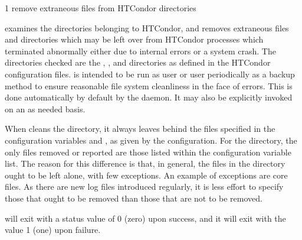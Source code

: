 \begin{ManPage}{\label{man-condor-preen}}{1}
{remove extraneous files from HTCondor directories}
\Synopsis {}


\Description 

 examines the directories belonging to HTCondor, 
and removes extraneous files and directories which may be left over from
HTCondor processes which terminated abnormally either due to internal errors or
a system crash. The directories checked are 
the , , and 
directories as defined in the HTCondor configuration files.  is
intended to be run as user  or user 
periodically as a backup
method to ensure reasonable file system cleanliness in the face of
errors. This is done automatically by default by the  daemon. 
It may also be explicitly invoked on an as needed basis.

When  cleans the  directory, it always leaves
behind the files specified in the configuration variables
 and ,
as given by the configuration.
For the  directory, the only files removed or reported are those
listed within the configuration variable  list.
The reason for this difference is that, in general,
the files in the  directory ought to be left alone,
with few exceptions.
An example of exceptions are core files.
As there are new log files introduced regularly,
it is less effort to specify those that ought to be removed
than those that are not to be removed.

\begin{Options}





\end{Options}

\ExitStatus

 will exit with a status value of 0 (zero) upon success,
and it will exit with the value 1 (one) upon failure.

\end{ManPage}
